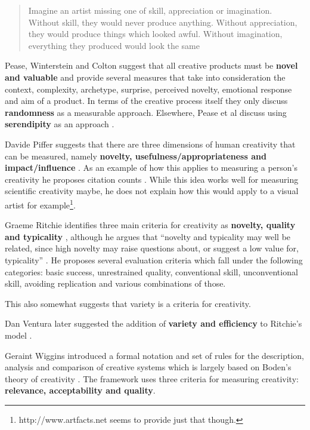 \begin{quote}
  Imagine an artist missing one of skill, appreciation or imagination. Without skill, they would never produce anything. Without appreciation, they would produce things which looked awful. Without imagination, everything they produced would look the same \parencite{Colton2008a}
\end{quote}

Pease, Winterstein and Colton suggest that all creative products must be \textbf{novel and valuable} \citeyear[p.1]{Pease2001} and provide several measures that take into consideration the context, complexity, archetype, surprise, perceived novelty, emotional response and aim of a product. In terms of the creative process itself they only discuss \textbf{randomness} as a measurable approach. Elsewhere, Pease et al discuss using \textbf{serendipity} as an approach \citeyear{Pease2013}.

Davide Piffer suggests that there are three dimensions of human creativity that can be measured, namely \textbf{novelty, usefulness/appropriateness and impact/influence} \citeyear[p.258-259]{Piffer2012}. As an example of how this applies to measuring a person’s creativity he proposes citation counts \parencite[p.261]{Piffer2012}. While this idea works well for measuring scientific creativity maybe, he does not explain how this would apply to a visual artist for example\footnote{http://www.artfacts.net seems to provide just that though.}.

Graeme Ritchie identifies three main criteria for creativity as \textbf{novelty, quality and typicality} \citeyear[p.72-73]{Ritchie2007}, although he argues that ``novelty and typicality may well be related, since high novelty may raise questions about, or suggest a low value for, typicality'' \citeyear[p.73]{Ritchie2007} \citeyear[see also][]{Ritchie2001}. He proposes several evaluation criteria which fall under the following categories: \parencite[p.91-92]{Ritchie2007} basic success, unrestrained quality, conventional skill, unconventional skill, avoiding replication and various combinations of those.

\begin{fcom}
  This also somewhat suggests that variety is a criteria for creativity.
\end{fcom}

Dan Ventura later suggested the addition of \textbf{variety and efficiency} to Ritchie’s model \citeyear[p.7]{Ventura2008}.

Geraint Wiggins introduced a formal notation and set of rules for the description, analysis and comparison of creative systems \citeyear{Wiggins2006} which is largely  based on Boden’s theory of creativity \citeyear{Boden2003}. The framework uses three criteria for measuring creativity: \textbf{relevance, acceptability and quality}.

